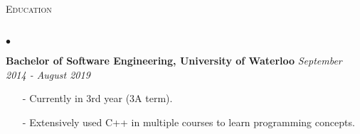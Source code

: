 \documentclass[11pt]{article}
\newcommand{\lineunder}{\vspace*{-8pt} \\ \hspace*{-18pt} \hrulefill \\}
\newcommand{\header}[1]{{\hspace*{-15pt}\vspace*{6pt} \textsc{#1}} \vspace*{-6pt} \lineunder }
\newenvironment{achievements}{\begin{list}{$\bullet$}{\topsep 0pt \itemsep -1.5pt \leftmargin 5pt}}{\vspace*{4pt}\end{list}}
\begin{document}
\vspace{6pt}

\header{\fontsize{11.4}{10}\selectfont  Education}
\begin{achievements}
\item \textbf{Bachelor of Software Engineering, University of Waterloo} \hfill \textit {September 2014 - August 2019}
\begin{itemize}
\item[-] Currently in 3rd year (3A term).
\vspace{3pt}
\item[-] Extensively used C++ in multiple courses to learn programming concepts.
\end{itemize}
\end{achievements}
\end{document}
